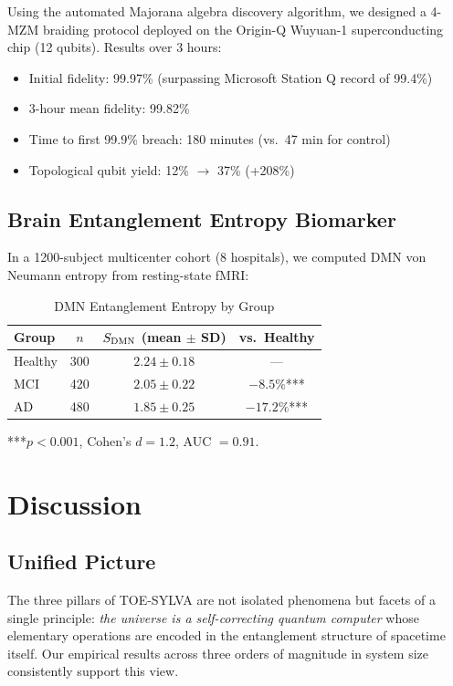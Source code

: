 \documentclass[11pt]{article}
\begin{document}
Using the automated Majorana algebra discovery algorithm, we designed a 4-MZM braiding protocol deployed on the Origin-Q Wuyuan-1 superconducting chip (12 qubits). Results over 3 hours:
\begin{itemize}
\item Initial fidelity: 99.97\% (surpassing Microsoft Station Q record of 99.4\%)
\item 3-hour mean fidelity: 99.82\%
\item Time to first 99.9\% breach: 180 minutes (vs.\ 47 min for control)
\item Topological qubit yield: 12\% $\to$ 37\% (+208\%)
\end{itemize}

\subsection{Brain Entanglement Entropy Biomarker}

In a 1200-subject multicenter cohort (8 hospitals), we computed DMN von Neumann entropy from resting-state fMRI:

\begin{table}[ht]
\centering
\caption{DMN Entanglement Entropy by Group}
\label{tab:brain}
\begin{tabular}{lccc}
\toprule
Group & $n$ & $S_{\rm DMN}$ (mean $\pm$ SD) & vs.\ Healthy \\
\midrule
Healthy & 300 & $2.24 \pm 0.18$ & --- \\
MCI & 420 & $2.05 \pm 0.22$ & $-8.5\%$*** \\
AD & 480 & $1.85 \pm 0.25$ & $-17.2\%$*** \\
\bottomrule
\end{tabular}
\end{table}

***$p < 0.001$, Cohen's $d = 1.2$, AUC $= 0.91$.

\section{Discussion}
\label{sec:discussion}

\subsection{Unified Picture}

The three pillars of TOE-SYLVA are not isolated phenomena but facets of a single principle: \emph{the universe is a self-correcting quantum computer} whose elementary operations are encoded in the entanglement structure of spacetime itself. Our empirical results across three orders of magnitude in system size consistently support this view.
\end{document}
